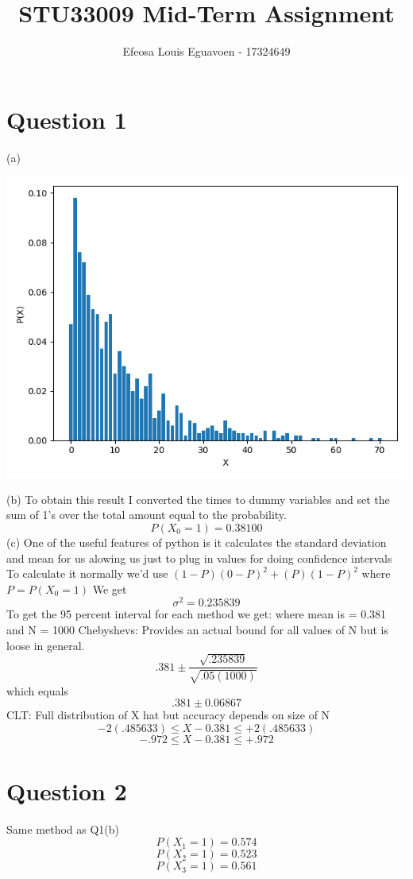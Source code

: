 \documentclass[11pt]{article} %
\title{STU33009 Mid-Term Assignment}
\author{Efeosa Louis Eguavoen - 17324649}
\begin{document}
\maketitle
\newpage
\section{Question 1}
(a)
\begin{center}
	\includegraphics[scale=0.5]{hist1.png}
\end{center}
(b)
\newline 
To obtain this result I converted the times to dummy variables and set the sum of 1's over the total amount equal to the probability.
\[P(X_0 =1) = 0.38100 \]
(c)
\newline
One of the useful features of python is it calculates the standard deviation and mean for us alowing us just to plug in values for doing confidence intervals
To calculate it normally we'd use
\((1-P)(0-P)^2 + (P)(1-P)^2\) where \(P = P(X_0 =1) \)
We get \[\sigma^2 = 0.235839\]
To get the 95 percent interval for each method we get: where mean is = 0.381 and N = 1000
\newline
Chebyshevs: Provides an actual bound for all values of N but is loose in general.
\[.381 \pm \frac{\sqrt{.235839}}{\sqrt{.05(1000)}}\]
which equals
\[.381 \pm 0.06867\]
CLT: Full distribution of X hat but accuracy depends on size of N
\[-2(.485633) \leq X - 0.381 \leq  + 2(.485633)\]
\[-.972 \leq X- 0.381 \leq +.972\]
\section{Question 2}
Same method as Q1(b)
\[P(X_1 = 1) = 0.574\]
\[P(X_2 = 1) = 0.523\]
\[P(X_3 = 1) = 0.561\]
\end{document}
